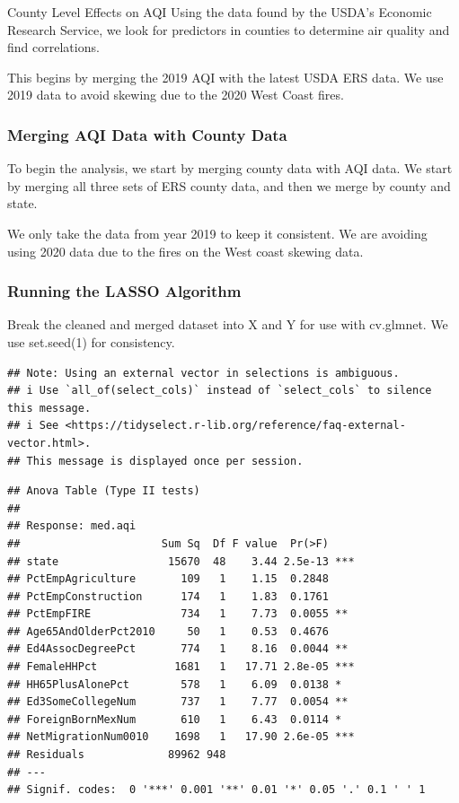 \documentclass[
  ignorenonframetext,
]{beamer}
\begin{document}
\begin{frame}{County Level Effects on AQI}
Using the data found by the USDA's Economic Research Service, we look
for predictors in counties to determine air quality and find
correlations.

This begins by merging the 2019 AQI with the latest USDA ERS data. We
use 2019 data to avoid skewing due to the 2020 West Coast fires.
\end{frame}

\begin{frame}
\frametitle{Merging AQI Data with County Data}

To begin the analysis, we start by merging county data with AQI data. We
start by merging all three sets of ERS county data, and then we merge by
county and state.

We only take the data from year 2019 to keep it consistent. We are
avoiding using 2020 data due to the fires on the West coast skewing
data.

\tiny
\end{frame}

\begin{frame}[fragile]
\frametitle{Running the LASSO Algorithm}

Break the cleaned and merged dataset into X and Y for use with
cv.glmnet. We use set.seed(1) for consistency.

\tiny

\begin{verbatim}
## Note: Using an external vector in selections is ambiguous.
## i Use `all_of(select_cols)` instead of `select_cols` to silence this message.
## i See <https://tidyselect.r-lib.org/reference/faq-external-vector.html>.
## This message is displayed once per session.
\end{verbatim}

\begin{verbatim}
## Anova Table (Type II tests)
## 
## Response: med.aqi
##                      Sum Sq  Df F value  Pr(>F)    
## state                 15670  48    3.44 2.5e-13 ***
## PctEmpAgriculture       109   1    1.15  0.2848    
## PctEmpConstruction      174   1    1.83  0.1761    
## PctEmpFIRE              734   1    7.73  0.0055 ** 
## Age65AndOlderPct2010     50   1    0.53  0.4676    
## Ed4AssocDegreePct       774   1    8.16  0.0044 ** 
## FemaleHHPct            1681   1   17.71 2.8e-05 ***
## HH65PlusAlonePct        578   1    6.09  0.0138 *  
## Ed3SomeCollegeNum       737   1    7.77  0.0054 ** 
## ForeignBornMexNum       610   1    6.43  0.0114 *  
## NetMigrationNum0010    1698   1   17.90 2.6e-05 ***
## Residuals             89962 948                    
## ---
## Signif. codes:  0 '***' 0.001 '**' 0.01 '*' 0.05 '.' 0.1 ' ' 1
\end{verbatim}
\end{frame}
\end{document}
